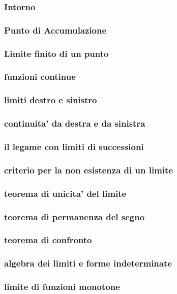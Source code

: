 \documentclass{article}
\theoremstyle{mystyle}
\begin{document}
\subsubsection{Intorno}
\subsubsection{Punto di Accumulazione}
\subsubsection{Limite finito di un punto}
\subsubsection{funzioni continue}
\subsubsection{limiti destro e sinistro}
\subsubsection{continuita' da destra e da sinistra}
\subsubsection{il legame con limiti di successioni}
\subsubsection{criterio per la non esistenza di un limite}
\subsubsection{teorema di unicita' del limite}
\subsubsection{teorema di permanenza del segno}
\subsubsection{teorema di confronto}
\subsubsection{algebra dei limiti e forme indeterminate}
\subsubsection{limite di funzioni monotone}
\end{document}
